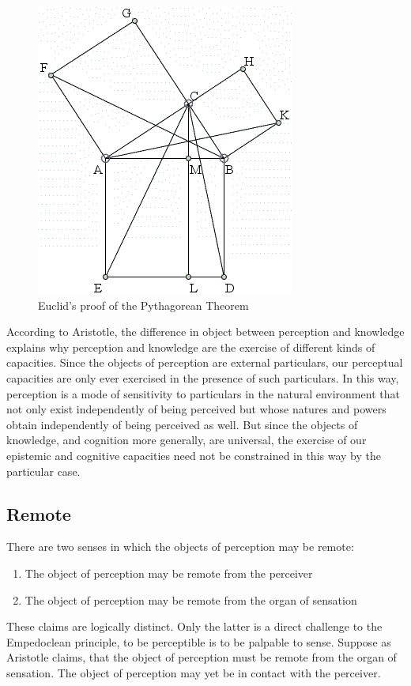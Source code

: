 \begin{figure}[htbp]
    \centering
        \includegraphics[scale=.55]{graphics/euclid.jpg}
    \caption{Euclid's proof of the Pythagorean Theorem}
    \label{fig:1.5}
\end{figure}


According to Aristotle, the difference in object between perception and know\-ledge explains why perception and knowledge are the exercise of different kinds of capacities. Since the objects of perception are external particulars, our perceptual capacities are only ever exercised in the presence of such particulars. In this way, perception is a mode of sensitivity to particulars in the natural environment that not only exist independently of being perceived but whose natures and powers obtain independently of being perceived as well. But since the objects of knowledge, and cognition more generally, are universal, the exercise of our epistemic and cognitive capacities need not be constrained in this way by the particular case.


\subsection{Remote} %
\label{sub:remote}

There are two senses in which the objects of perception may be remote:
\begin{enumerate}[(1)]
	\item The object of perception may be remote from the perceiver
	\item The object of perception may be remote from the organ of sensation
\end{enumerate}
These claims are logically distinct. Only the latter is a direct challenge to the Empedoclean principle, to be perceptible is to be palpable to sense. Suppose as Aristotle claims, that the object of perception must be remote from the organ of sensation. The object of perception may yet be in contact with the perceiver.

